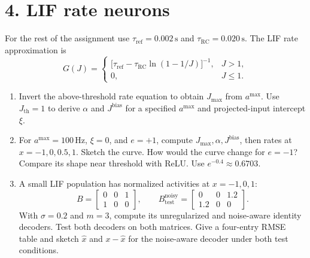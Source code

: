 \documentclass[11pt,letterpaper]{article}
\begin{document}
\section*{4. LIF rate neurons}
For the rest of the assignment use \(\tau_{\mathrm{ref}}=0.002\,\mathrm{s}\) and \(\tau_{\mathrm{RC}}=0.020\,\mathrm{s}\). The LIF rate approximation is
\[
G(J)=\begin{cases}
\displaystyle\bigl[\tau_{\mathrm{ref}}-\tau_{\mathrm{RC}}\ln(1-1/J)\bigr]^{-1},&J>1,\\
0,&J\leq1.
\end{cases}
\]
\begin{enumerate}[label=\textbf{4\alph*.}]
\item Invert the above-threshold rate equation to obtain \(J_{\max}\) from \(a^{\max}\). Use \(J_{\mathrm{th}}=1\) to derive \(\alpha\) and \(J^{\mathrm{bias}}\) for a specified \(a^{\max}\) and projected-input intercept \(\xi\).
\item For \(a^{\max}=100\,\mathrm{Hz}\), \(\xi=0\), and \(e=+1\), compute \(J_{\max},\alpha,J^{\mathrm{bias}}\), then rates at \(x=-1,0,0.5,1\). Sketch the curve. How would the curve change for \(e=-1\)? Compare its shape near threshold with ReLU. Use \(e^{-0.4}\approx0.6703\).
\item A small LIF population has normalized activities at \(x=-1,0,1\):
\[
B=\begin{bmatrix}0&0&1\\1&0&0\end{bmatrix},\qquad
B_{\mathrm{test}}^{\mathrm{noisy}}=\begin{bmatrix}0&0&1.2\\1.2&0&0\end{bmatrix}.
\]
With \(\sigma=0.2\) and \(m=3\), compute its unregularized and noise-aware identity decoders. Test both decoders on both matrices. Give a four-entry RMSE table and sketch \(\hat{x}\) and \(x-\hat{x}\) for the noise-aware decoder under both test conditions.
\end{enumerate}

\newpage
\end{document}
